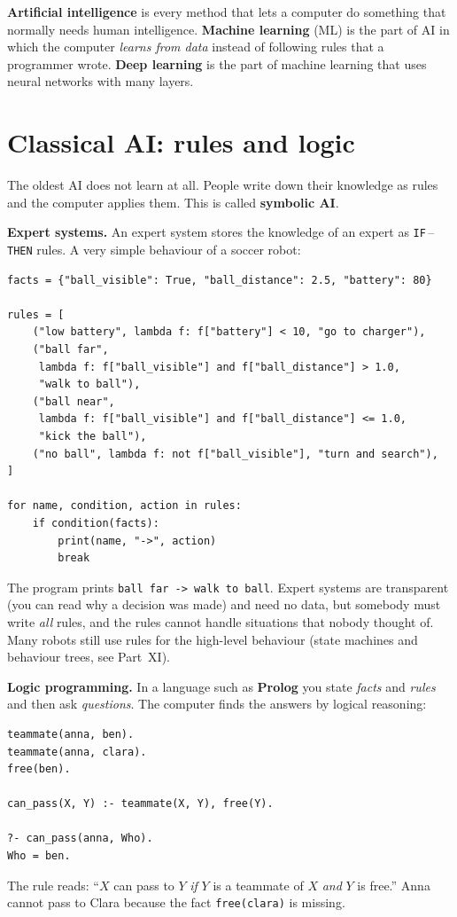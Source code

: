 \begin{keyidea}
\textbf{Artificial intelligence} is every method that lets a computer do something that normally needs human intelligence. \textbf{Machine learning} (ML) is the part of AI in which the computer \emph{learns from data} instead of following rules that a programmer wrote. \textbf{Deep learning} is the part of machine learning that uses neural networks with many layers.
\end{keyidea}

\section*{Classical AI: rules and logic}
The oldest AI does not learn at all. People write down their knowledge as rules and the computer applies them. This is called \textbf{symbolic AI}.

\textbf{Expert systems.} An expert system stores the knowledge of an expert as \texttt{IF}\,--\,\texttt{THEN} rules. A very simple behaviour of a soccer robot:
\begin{verbatim}
facts = {"ball_visible": True, "ball_distance": 2.5, "battery": 80}

rules = [
    ("low battery", lambda f: f["battery"] < 10, "go to charger"),
    ("ball far",
     lambda f: f["ball_visible"] and f["ball_distance"] > 1.0,
     "walk to ball"),
    ("ball near",
     lambda f: f["ball_visible"] and f["ball_distance"] <= 1.0,
     "kick the ball"),
    ("no ball", lambda f: not f["ball_visible"], "turn and search"),
]

for name, condition, action in rules:
    if condition(facts):
        print(name, "->", action)
        break
\end{verbatim}
The program prints \texttt{ball far -> walk to ball}. Expert systems are transparent (you can read why a decision was made) and need no data, but somebody must write \emph{all} rules, and the rules cannot handle situations that nobody thought of. Many robots still use rules for the high-level behaviour (state machines and behaviour trees, see Part~XI).

\textbf{Logic programming.} In a language such as \textbf{Prolog} you state \emph{facts} and \emph{rules} and then ask \emph{questions}. The computer finds the answers by logical reasoning:
\begin{verbatim}
teammate(anna, ben).
teammate(anna, clara).
free(ben).

can_pass(X, Y) :- teammate(X, Y), free(Y).

?- can_pass(anna, Who).
Who = ben.
\end{verbatim}
The rule reads: ``$X$ can pass to $Y$ \emph{if} $Y$ is a teammate of $X$ \emph{and} $Y$ is free.'' Anna cannot pass to Clara because the fact \texttt{free(clara)} is missing.

